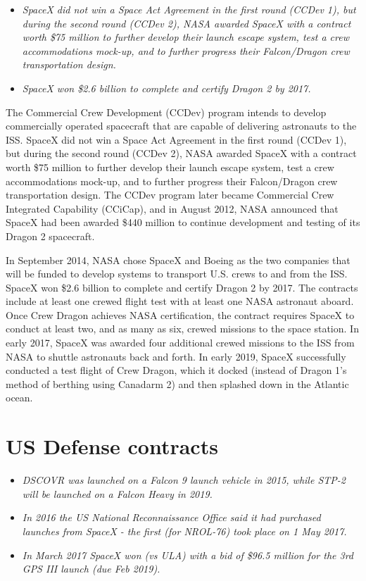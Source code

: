 \begin{itemize}
\item
  \emph{SpaceX did not win a Space Act Agreement in the first round
  (CCDev 1), but during the second round (CCDev 2), NASA awarded SpaceX
  with a contract worth \$75 million to further develop their launch
  escape system, test a crew accommodations mock-up, and to further
  progress their Falcon/Dragon crew transportation design.}
\item
  \emph{SpaceX won \$2.6 billion to complete and certify Dragon 2 by
  2017.}
\end{itemize}

The Commercial Crew Development (CCDev) program intends to develop
commercially operated spacecraft that are capable of delivering
astronauts to the ISS. SpaceX did not win a Space Act Agreement in the
first round (CCDev 1), but during the second round (CCDev 2), NASA
awarded SpaceX with a contract worth \$75 million to further develop
their launch escape system, test a crew accommodations mock-up, and to
further progress their Falcon/Dragon crew transportation design. The
CCDev program later became Commercial Crew Integrated Capability
(CCiCap), and in August 2012, NASA announced that SpaceX had been
awarded \$440 million to continue development and testing of its Dragon
2 spacecraft.

In September 2014, NASA chose SpaceX and Boeing as the two companies
that will be funded to develop systems to transport U.S. crews to and
from the ISS. SpaceX won \$2.6 billion to complete and certify Dragon 2
by 2017. The contracts include at least one crewed flight test with at
least one NASA astronaut aboard. Once Crew Dragon achieves NASA
certification, the contract requires SpaceX to conduct at least two, and
as many as six, crewed missions to the space station. In early 2017,
SpaceX was awarded four additional crewed missions to the ISS from NASA
to shuttle astronauts back and forth. In early 2019, SpaceX successfully
conducted a test flight of Crew Dragon, which it docked (instead of
Dragon 1's method of berthing using Canadarm 2) and then splashed down
in the Atlantic ocean.

\section{US Defense contracts}\label{us-defense-contracts}

\begin{itemize}
\item
  \emph{DSCOVR was launched on a Falcon 9 launch vehicle in 2015, while
  STP-2 will be launched on a Falcon Heavy in 2019.}
\item
  \emph{In 2016 the US National Reconnaissance Office said it had
  purchased launches from SpaceX - the first (for NROL-76) took place on
  1 May 2017.}
\item
  \emph{In March 2017 SpaceX won (vs ULA) with a bid of \$96.5 million
  for the 3rd GPS III launch (due Feb 2019).}
\end{itemize}

